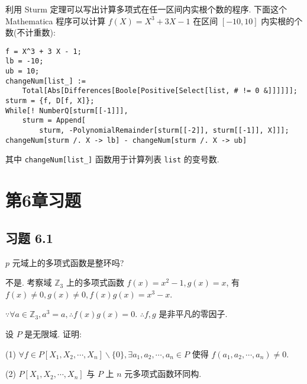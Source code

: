 \documentclass[color=black,device=normal,lang=cn,mode=geye]{elegantnote}
\begin{document}
利用 Sturm 定理可以写出计算多项式在任一区间内实根个数的程序. 下面这个 Mathematica 程序可以计算 $f(X)=X^3+3X-1$ 在区间 $[-10,10]$ 内实根的个数(不计重数):
\begin{verbatim}
f = X^3 + 3 X - 1;
lb = -10;
ub = 10;
changeNum[list_] := 
    Total[Abs[Differences[Boole[Positive[Select[list, # != 0 &]]]]]];
sturm = {f, D[f, X]};
While[! NumberQ[sturm[[-1]]], 
    sturm = Append[
        sturm, -PolynomialRemainder[sturm[[-2]], sturm[[-1]], X]]];
changeNum[sturm /. X -> lb] - changeNum[sturm /. X -> ub]
\end{verbatim}
其中 \verb|changeNum[list_]| 函数用于计算列表 \verb|list| 的变号数.
\section{第6章习题}
\subsection{习题 6.1}
\begin{exercise}%
    $p$ 元域上的多项式函数是整环吗?
\end{exercise}
\begin{solution}
    不是. 考察域 $\mathbb{Z}_3$ 上的多项式函数 $f(x)=x^2-1,g(x)=x$, 有 $f(x)\neq0,g(x)\neq0,f(x)g(x)=x^3-x$.

    $\because\forall a\in\mathbb{Z}_3,a^3=a,\therefore f(x)g(x)=0$. $\therefore f,g$ 是非平凡的零因子.
\end{solution}
\begin{exercise}%
    设 $P$ 是无限域. 证明:
    
    (1) $\forall f\in P[X_1,X_2,\cdots,X_n]\backslash\{0\},\exists a_1,a_2,\cdots,a_n\in P$ 使得 $f(a_1,a_2,\cdots,a_n)\neq0$.

    (2) $P[X_1,X_2,\cdots,X_n]$ 与 $P$ 上 $n$ 元多项式函数环同构.
\end{exercise}
\end{document}
